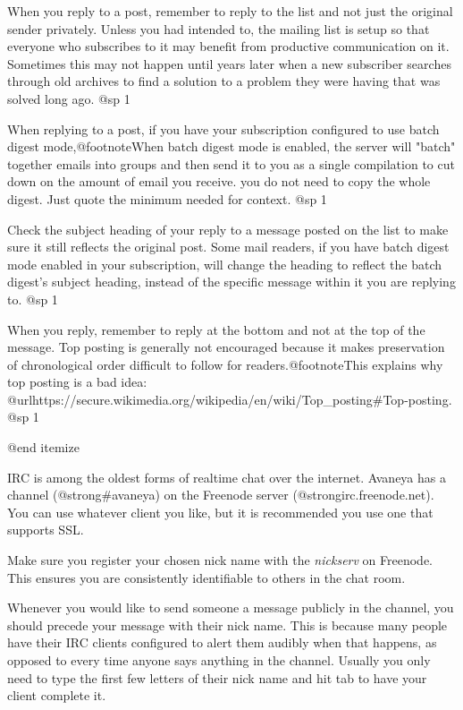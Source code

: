 \item
When you reply to a post, remember to reply to the list and not just the original sender privately. Unless you had intended to, the mailing list is setup so that everyone who subscribes to it may benefit from productive communication on it. Sometimes this may not happen until years later when a new subscriber searches through old archives to find a solution to a problem they were having that was solved long ago.
@sp 1

\item
When replying to a post, if you have your subscription configured to use batch digest mode,@footnote{When batch digest mode is enabled, the server will "batch" together emails into groups and then send it to you as a single compilation to cut down on the amount of email you receive.} you do not need to copy the whole digest. Just quote the minimum needed for context.
@sp 1

\item
Check the subject heading of your reply to a message posted on the list to make sure it still reflects the original post. Some mail readers, if you have batch digest mode enabled in your subscription, will change the heading to reflect the batch digest's subject heading, instead of the specific message within it you are replying to.
@sp 1

\item
When you reply, remember to reply at the bottom and not at the top of the message. Top posting is generally not encouraged because it makes preservation of chronological order difficult to follow for readers.@footnote{This explains why top posting is a bad idea: @url{https://secure.wikimedia.org/wikipedia/en/wiki/Top_posting#Top-posting}.}
@sp 1

@end itemize


IRC is among the oldest forms of realtime chat over the internet. Avaneya has a channel (@strong{#avaneya}) on the Freenode server (@strong{irc.freenode.net}). You can use whatever client you like, but it is recommended you use one that supports SSL.

Make sure you register your chosen nick name with the {\it nickserv} on Freenode. This ensures you are consistently identifiable to others in the chat room.

Whenever you would like to send someone a message publicly in the channel, you should precede your message with their nick name. This is because many people have their IRC clients configured to alert them audibly when that happens, as opposed to every time anyone says anything in the channel. Usually you only need to type the first few letters of their nick name and hit tab to have your client complete it.


